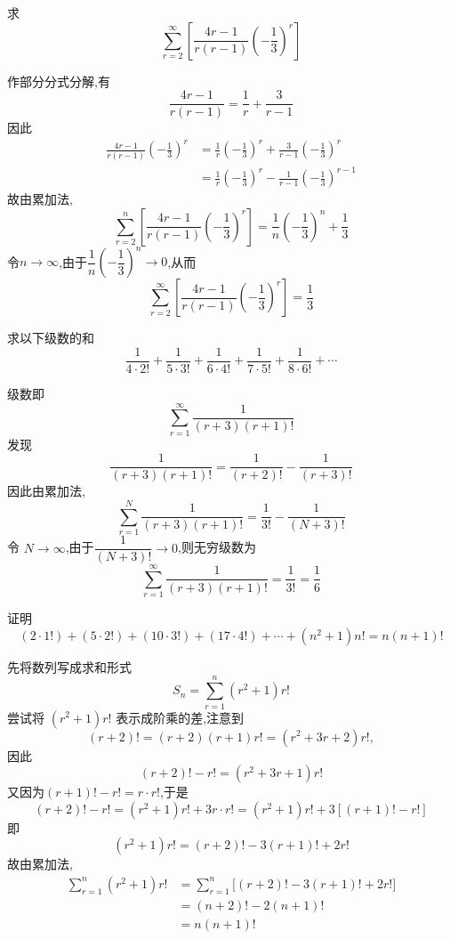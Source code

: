 \begin{questions}
    \question 求
    \[
    \sum_{r=2}^{\infty}\left[\frac{4r-1}{r(r-1)}\left(-\frac{1}{3}\right)^r\right]
    \]
    \begin{solution}
        作部分分式分解,有
        \[
        \frac{4r-1}{r(r-1)}=\frac{1}{r}+\frac{3}{r-1}
        \]
        因此
        \begin{align*}
        \frac{4r-1}{r(r-1)}\left(-\frac{1}{3}\right)^r
        &=\frac{1}{r}\left(-\frac{1}{3}\right)^r+\frac{3}{r-1}\left(-\frac{1}{3}\right)^r\\
        &=\frac{1}{r}\left(-\frac{1}{3}\right)^r
        -\frac{1}{r-1}\left(-\frac{1}{3}\right)^{r-1}
        \end{align*}
        故由累加法,
        \[
        \sum_{r=2}^{n}\left[\frac{4r-1}{r(r-1)}\left(-\frac{1}{3}\right)^r\right]
        =\frac{1}{n}\left(-\frac{1}{3}\right)^n+\frac{1}{3}
        \]
        令$n\to\infty$,由于$\dfrac{1}{n}\left(-\dfrac{1}{3}\right)^n\to 0$,从而
        \[
        \sum_{r=2}^{\infty}\left[\frac{4r-1}{r(r-1)}\left(-\frac{1}{3}\right)^r\right]
        =\frac{1}{3}
        \]
    \end{solution}

    \question 求以下级数的和
    \[
    \frac{1}{4\cdot 2!} + \frac{1}{5\cdot 3!} + \frac{1}{6\cdot 4!} + \frac{1}{7\cdot 5!} + \frac{1}{8\cdot 6!} + \cdots
    \]
    \begin{solution}
        级数即
        \[
        \sum_{r=1}^{\infty} \frac{1}{(r+3)(r+1)!}
        \]
        发现
        \[
        \frac{1}{(r+3)(r+1)!} = \frac{1}{(r+2)!} - \frac{1}{(r+3)!}
        \]
        因此由累加法,
        \[
        \sum_{r=1}^{N} \frac{1}{(r+3)(r+1)!}= \frac{1}{3!} - \frac{1}{(N+3)!}
        \]
        令 $N \to \infty$,由于$\dfrac{1}{(N+3)!} \to 0$,则无穷级数为
        \[
        \sum_{r=1}^{\infty} \frac{1}{(r+3)(r+1)!} = \frac{1}{3!} = \frac{1}{6}
        \]
    \end{solution}

    \question 证明
    \[
    (2\cdot 1!)+(5\cdot 2!)+(10\cdot 3!)+(17\cdot 4!)+\cdots+(n^2+1)n!=n(n+1)!
    \]
    \begin{solution}
        先将数列写成求和形式
        \[
        S_n=\sum_{r=1}^{n}(r^2+1)r!
        \]
        尝试将 $(r^2+1)r!$ 表示成阶乘的差,注意到
        \[
        (r+2)!=(r+2)(r+1)r!=(r^2+3r+2)r!,
        \]
        因此
        \[
        (r+2)!-r!=(r^2+3r+1)r!
        \]
        又因为$(r+1)!-r!=r\cdot r!$,于是
        \[
        (r+2)!-r!=(r^2+1)r!+3r\cdot r!=(r^2+1)r!+3[(r+1)!-r!]
        \]
        即
        \[
        (r^2+1)r!=(r+2)!-3(r+1)!+2r!
        \]
        故由累加法,
        \begin{align*}
        \sum_{r=1}^{n}(r^2+1)r!
        &=\sum_{r=1}^{n}\big[(r+2)!-3(r+1)!+2r!\big]\\
        &=(n+2)!-2(n+1)! \\
        &=n(n+1)!
        \end{align*}
    \end{solution}


\end{questions}
